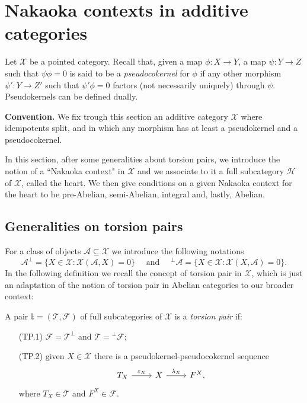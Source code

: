 \clearpage

\section{Nakaoka contexts in additive categories}

Let $\mathcal{X}$ be a pointed category. Recall that, given a map $\phi\colon X\to Y$, a map $\psi\colon Y\to Z$ such that $\psi\phi=0$ is said to be a {\em pseudocokernel} for $\phi$ if any other morphism $\psi'\colon Y\to Z'$ such that $\psi'\phi=0$ factors (not necessarily uniquely) through $\psi$. Pseudokernels can be defined dually.

\medskip\noindent
{\bf Convention.} We fix  trough this section an additive category $\mathcal{X}$ where  idempotents split, and in which any morphism has at least a pseudokernel and a pseudocokernel.

\medskip
In this section, after some generalities about torsion pairs, we introduce the notion of a ``Nakaoka context" in $\mathcal X$ and we associate to it a full subcategory $\mathcal H$ of $\mathcal X$, called the heart. We then give conditions on a given Nakaoka context for the heart to be pre-Abelian, semi-Abelian, integral and, lastly, Abelian. 

\subsection{Generalities on torsion pairs}

For a class of objects $\mathcal A\subseteq \mathcal X$ we introduce the following notations
\[
\mathcal A^\perp = \{X\in\mathcal{X}:\mathcal{X}(\mathcal A,X)=0\}\quad \text{ and }\quad {^\perp\mathcal A} = \{X\in\mathcal{X}:\mathcal{X}(X,\mathcal A)=0\}.
\]
In the following definition we recall the concept of torsion pair in $\mathcal X$, which is just an adaptation of the notion of torsion pair in Abelian categories to our broader context:

\begin{definition}
A pair $\mathbb{t}=(\mathcal{T},\mathcal{F})$ of full subcategories of $\mathcal{X}$ is  a {\em torsion pair} if:
\begin{enumerate}
\item[\rm (TP.1)] $\mathcal{F}=\mathcal{T}^\perp$ and $\mathcal{T}={^\perp\mathcal{F}}$;
\item[\rm (TP.2)] given $X\in\mathcal{X}$ there is a pseudokernel-pseudocokernel sequence
\begin{equation*}
\begin{tikzcd}
T_X\arrow{r}{\varepsilon_X}& X\arrow{r}{\lambda_X}&F^X,
\end{tikzcd}
\end{equation*}
where $T_X\in\mathcal{T}$ and $F^X\in\mathcal{F}$.
\end{enumerate}
\end{definition}


